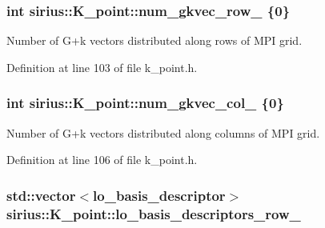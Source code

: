 \subsubsection[{num\+\_\+gkvec\+\_\+row\+\_\+}]{\setlength{\rightskip}{0pt plus 5cm}int sirius\+::\+K\+\_\+point\+::num\+\_\+gkvec\+\_\+row\+\_\+ \{0\}\hspace{0.3cm}{\ttfamily [private]}}\label{classsirius_1_1_k__point_a5d6c36943d1096bf7e27e0a81ac834e3}


Number of G+k vectors distributed along rows of M\+P\+I grid. 



Definition at line 103 of file k\+\_\+point.\+h.

\hypertarget{classsirius_1_1_k__point_ac3074a84beb6d7df14aff1d8e1402d07}{}
\subsubsection[{num\+\_\+gkvec\+\_\+col\+\_\+}]{\setlength{\rightskip}{0pt plus 5cm}int sirius\+::\+K\+\_\+point\+::num\+\_\+gkvec\+\_\+col\+\_\+ \{0\}\hspace{0.3cm}{\ttfamily [private]}}\label{classsirius_1_1_k__point_ac3074a84beb6d7df14aff1d8e1402d07}


Number of G+k vectors distributed along columns of M\+P\+I grid. 



Definition at line 106 of file k\+\_\+point.\+h.

\hypertarget{classsirius_1_1_k__point_a7dfee55675c203957134694bfedca21a}{}
\subsubsection[{lo\+\_\+basis\+\_\+descriptors\+\_\+row\+\_\+}]{\setlength{\rightskip}{0pt plus 5cm}std\+::vector$<${\bf lo\+\_\+basis\+\_\+descriptor}$>$ sirius\+::\+K\+\_\+point\+::lo\+\_\+basis\+\_\+descriptors\+\_\+row\+\_\+\hspace{0.3cm}{\ttfamily [private]}}\label{classsirius_1_1_k__point_a7dfee55675c203957134694bfedca21a}


